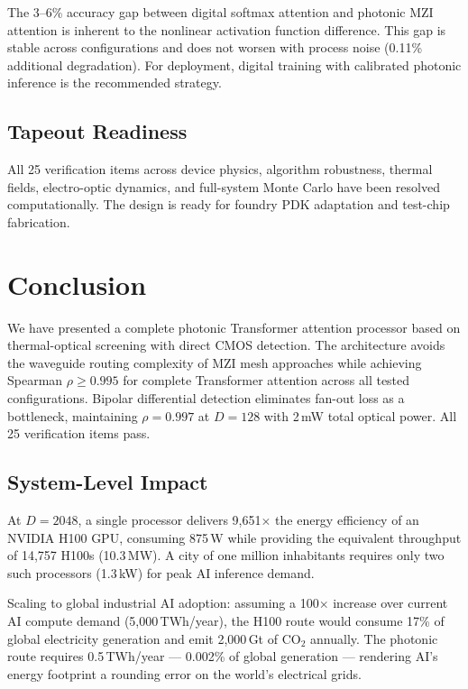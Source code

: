 \documentclass[conference]{IEEEtran}
\begin{document}
The 3--6\% accuracy gap between digital softmax attention and photonic
MZI attention is inherent to the nonlinear activation function
difference. This gap is stable across configurations and does not
worsen with process noise (0.11\% additional degradation). For
deployment, digital training with calibrated photonic inference is
the recommended strategy.

\subsection{Tapeout Readiness}

All 25 verification items across device physics, algorithm robustness,
thermal fields, electro-optic dynamics, and full-system Monte Carlo
have been resolved computationally. The design is ready for foundry
PDK adaptation and test-chip fabrication.

\section{Conclusion}

We have presented a complete photonic Transformer attention processor
based on thermal-optical screening with direct CMOS detection. The
architecture avoids the waveguide routing complexity of MZI mesh
approaches while achieving Spearman $\rho\ge0.995$ for complete
Transformer attention across all tested configurations. Bipolar
differential detection eliminates fan-out loss as a bottleneck,
maintaining $\rho=0.997$ at $D=128$ with 2\,mW total optical power.
All 25 verification items pass.

\subsection{System-Level Impact}

At $D=2048$, a single processor delivers 9,651$\times$ the energy
efficiency of an NVIDIA H100 GPU, consuming 875\,W while providing
the equivalent throughput of 14,757 H100s (10.3\,MW). A city of one
million inhabitants requires only two such processors (1.3\,kW) for
peak AI inference demand.

Scaling to global industrial AI adoption: assuming a 100$\times$
increase over current AI compute demand (5,000\,TWh/year), the H100
route would consume 17\% of global electricity generation and emit
2,000\,Gt of CO$_2$ annually. The photonic route requires 0.5\,TWh/year
--- 0.002\% of global generation --- rendering AI's energy footprint
a rounding error on the world's electrical grids.
\end{document}
